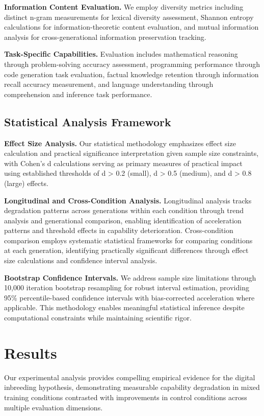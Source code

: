 \documentclass{article}
\begin{document}
\textbf{Information Content Evaluation.} We employ diversity metrics including distinct n-gram measurements for lexical diversity assessment, Shannon entropy calculations for information-theoretic content evaluation, and mutual information analysis for cross-generational information preservation tracking.

\textbf{Task-Specific Capabilities.} Evaluation includes mathematical reasoning through problem-solving accuracy assessment, programming performance through code generation task evaluation, factual knowledge retention through information recall accuracy measurement, and language understanding through comprehension and inference task performance.

\subsection{Statistical Analysis Framework}

\textbf{Effect Size Analysis.} Our statistical methodology emphasizes effect size calculation and practical significance interpretation given sample size constraints, with Cohen's d calculations serving as primary measures of practical impact using established thresholds of d > 0.2 (small), d > 0.5 (medium), and d > 0.8 (large) effects.

\textbf{Longitudinal and Cross-Condition Analysis.} Longitudinal analysis tracks degradation patterns across generations within each condition through trend analysis and generational comparison, enabling identification of acceleration patterns and threshold effects in capability deterioration. Cross-condition comparison employs systematic statistical frameworks for comparing conditions at each generation, identifying practically significant differences through effect size calculations and confidence interval analysis.

\textbf{Bootstrap Confidence Intervals.} We address sample size limitations through 10,000 iteration bootstrap resampling for robust interval estimation, providing 95\% percentile-based confidence intervals with bias-corrected acceleration where applicable. This methodology enables meaningful statistical inference despite computational constraints while maintaining scientific rigor.

\section{Results}

Our experimental analysis provides compelling empirical evidence for the digital inbreeding hypothesis, demonstrating measurable capability degradation in mixed training conditions contrasted with improvements in control conditions across multiple evaluation dimensions.
\end{document}
